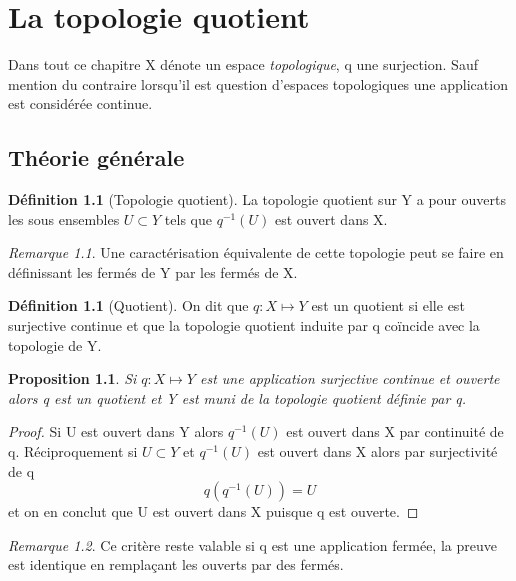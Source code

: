 \documentclass[12pt]{book}
\newtheorem{prop}[lemma]{Proposition}
\theoremstyle{definition}
\newtheorem{definition}[lemma]{Définition}
\theoremstyle{remark}
\newtheorem*{remark}{Remarque}
\begin{document}
	\chapter{La topologie quotient}
	Dans tout ce chapitre X dénote un espace \emph{topologique}, q une surjection. Sauf mention du contraire lorsqu'il est question d'espaces topologiques une application est considérée continue.

	\section{Théorie générale}
	\begin{definition}[Topologie quotient]
		La topologie quotient sur Y a pour ouverts les sous ensembles $U \subset Y$ tels que $q^{-1}(U)$ est ouvert dans X.
	\end{definition}
	\begin{remark}
		Une caractérisation équivalente de cette topologie peut se faire en définissant les fermés de Y par les fermés de X.
	\end{remark}
	\begin{definition}[Quotient]
		On dit que $q : X \longmapsto Y$ est un quotient si elle est surjective continue et que la topologie quotient induite par q coïncide avec la topologie de Y.	
	\end{definition}
	\begin{prop}
		Si $q : X \longmapsto Y$ est une application surjective continue et ouverte alors q est un quotient et Y est muni de la topologie quotient définie par q.
	\end{prop}
	\begin{proof}
		Si U est ouvert dans Y alors $q^{-1}(U)$ est ouvert dans X par continuité de q. Réciproquement si  $ U \subset Y$ et $q^{-1}(U)$ est ouvert dans X alors par surjectivité de q  \[
			q(q^{-1}(U)) = U
		\] et on en conclut que U est ouvert dans X puisque q est ouverte. 
	\end{proof}
	\begin{remark}
		Ce critère reste valable si q est une application fermée, la preuve est identique en remplaçant les ouverts par des fermés.
	\end{remark}
\end{document}
